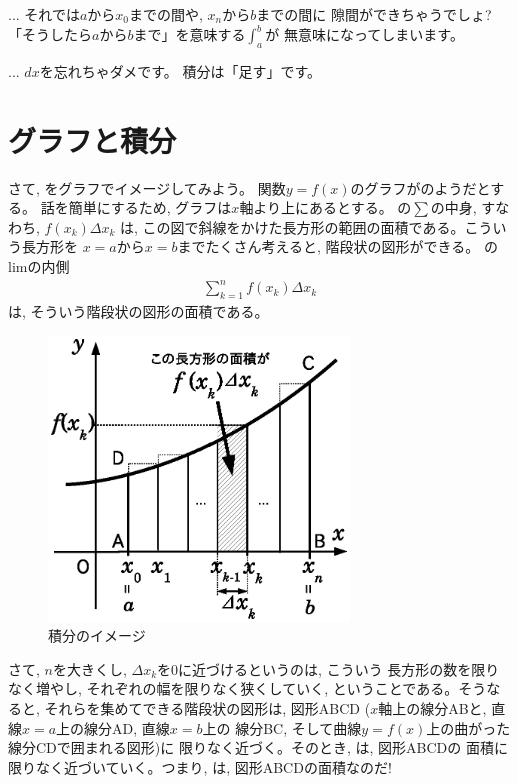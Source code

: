 \begin{freqmiss}{\small{}
 ... それでは$a$から$x_0$までの間や, $x_n$から$b$までの間に
隙間ができちゃうでしょ? 「そうしたら$a$から$b$まで」を意味する$\int_a^b$が
無意味になってしまいます。}\end{freqmiss}

\begin{freqmiss}{\small{} ... $dx$を忘れちゃダメです。
積分は「足す」です。}\end{freqmiss}
\mv


\section{グラフと積分}\label{sect:graph_integral}
さて, をグラフでイメージしてみよう。
関数$y=f(x)$のグラフがのようだとする。
話を簡単にするため, グラフは$x$軸より上にあるとする。
の$\sum$の中身, すなわち, 
$f(x_k)\Delta x_k$
は, この図で斜線をかけた長方形の範囲の面積である。こういう長方形を
$x=a$から$x=b$までたくさん考えると, 階段状の図形ができる。
のlimの内側
\begin{eqnarray}
\sum^{n}_{k=1} f(x_k)\Delta x_k\label{eq:WhatIsIntegral24}
\end{eqnarray}
は, そういう階段状の図形の面積である。
\begin{figure}[h]
    \centering
    \includegraphics[width=8cm]{integral_strip.eps}
    \caption{積分のイメージ}\label{fig:integral_strip}
\end{figure}
さて, $n$を大きくし, $\Delta x_k$を0に近づけるというのは, こういう
長方形の数を限りなく増やし, それぞれの幅を限りなく狭くしていく, 
ということである。そうなると, それらを集めてできる階段状の図形は, 
図形ABCD ($x$軸上の線分ABと, 直線$x=a$上の線分AD, 直線$x=b$上の
線分BC, そして曲線$y=f(x)$上の曲がった線分CDで囲まれる図形)に
限りなく近づく。そのとき, は, 図形ABCDの
面積に限りなく近づいていく。つまり, は, 
図形ABCDの面積なのだ!

